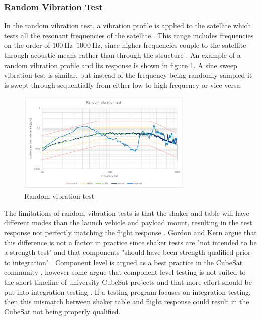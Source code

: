 \documentclass{report}
\begin{document}
\subsubsection{Random Vibration Test}
In the random vibration test, a vibration profile is applied to the satellite which tests all the resonant frequencies of the satellite \cite{nieto2019cubesat}. This range includes frequencies on the order of $\SIrange{100}{1000}{\hertz}$, since higher frequencies couple to the satellite through acoustic means rather than through the structure \cite{gordon2015benefits}. An example of a random vibration profile and its response is shown in figure \ref{fig:random}. A sine sweep vibration test is similar, but instead of the frequency being randomly sampled it is swept through sequentially from either low to high frequency or vice versa.

\begin{figure}[H]
  \centering
  \includegraphics[width=0.75\textwidth]{images/random-study.png}
  \caption{Random vibration test \cite{nieto2019cubesat}}
  \label{fig:random}
\end{figure}

The limitations of random vibration tests is that the shaker and table will have different modes than the launch vehicle and payload mount, resulting in the test response not perfectly matching the flight response \cite{gordon2015benefits,aglietti2019spacecraft}. Gordon and Kern argue that this difference is not a factor in practice since shaker tests are "not intended to be a strength test"  \cite[p.~7]{gordon2015benefits} and that components "should have been strength qualified prior to integration" \cite[p.~7]{gordon2015benefits}. Component level is argued as a best practice in the CubeSat community \cite{rawsonbest}, however some argue that component level testing is not suited to the short timeline of university CubeSat projects and that more effort should be put into integration testing \cite{decker2016systems}. If a testing program focuses on integration testing, then this mismatch between shaker table and flight response could result in the CubeSat not being properly qualified.
\end{document}
